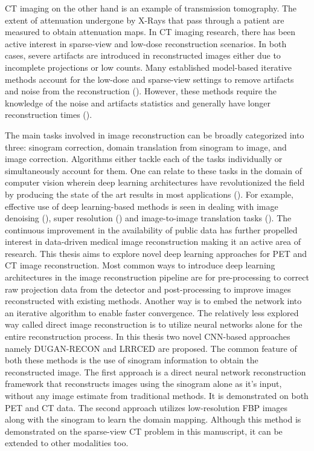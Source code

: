 \ac{CT} imaging on the other hand is an example of transmission tomography. The extent of attenuation undergone by X-Rays that pass through a patient are measured to obtain attenuation maps. In \ac{CT} imaging research, there has been active interest in sparse-view and low-dose reconstruction scenarios. In both cases, severe artifacts are introduced in  reconstructed images either due to incomplete projections or low counts. Many established model-based iterative methods account for the low-dose and sparse-view settings to remove artifacts and noise from the reconstruction (\cite{nuyts1998iterative,Elbakri2002,liu2013total}). However, these methods require the knowledge of the noise and artifacts statistics and generally have longer reconstruction times (\cite{kim2014combining}). 


The main tasks involved in image reconstruction can be broadly categorized into three: sinogram correction, domain translation from sinogram to image, and image correction. Algorithms either tackle each of the tasks individually or simultaneously account for them. One can relate to these tasks in the domain of computer vision wherein deep learning architectures have revolutionized the field by producing the state of the art results in most applications (\cite{guo2016deep}). For example, effective use of deep learning-based methods is seen in dealing with image denoising (\cite{kadimesetty2018convolutional,li2020sacnn,chen2017low,yang2018low}), super resolution (\cite{ledig2017photo,lim2017enhanced}) and image-to-image translation tasks (\cite{isola2017image,zhu2017unpaired}). The continuous improvement in the availability of public data has further propelled interest in data-driven medical image reconstruction making it an active area of research. This thesis aims to explore novel deep learning approaches for \ac{PET} and \ac{CT} image reconstruction. Most common ways to introduce deep learning architectures in the image reconstruction pipeline are for pre-processing to correct raw projection data from the detector and post-processing to improve images reconstructed with existing methods. Another way is to embed the network into an iterative algorithm to enable faster convergence. The relatively less explored way called direct image reconstruction is to utilize neural networks alone for the entire reconstruction process. In this thesis two novel \ac{CNN}-based approaches namely \ac{DUGAN}-RECON and \ac{LRRCED} are proposed. The common feature of both these methods is the use of sinogram information to obtain the reconstructed image. The first approach is a direct neural network reconstruction framework that reconstructs images using the sinogram alone as it's input, without any image estimate from traditional methods. It is demonstrated on both \ac{PET} and \ac{CT} data. The second approach utilizes low-resolution \ac{FBP} images along with the sinogram to learn the domain mapping. Although this method is demonstrated on the sparse-view \ac{CT} problem in this manuscript, it can be extended to other modalities too. 


